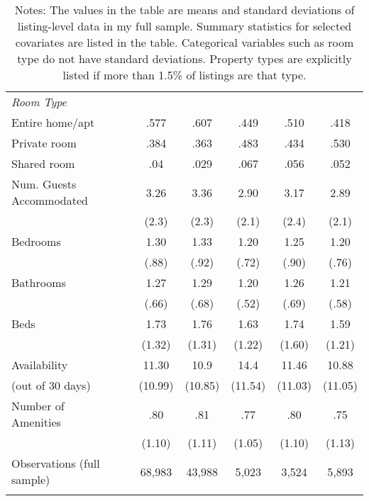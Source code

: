 {\begin{longtable}{l*{6}{c}}
\textit{Room Type} \\
Entire home/apt   &   & .577   	&      .607	&      .449  &      .510		&    .418\\
Private room       &  & 	.384		&      .363	&      .483  &      .434		&    .530\\
Shared room      &  &	.04	 	&      .029	&      .067  &      .056		&    .052\\
[1em]
Num. Guests Accommodated    &    &      3.26	&      3.36  &      2.90		&    3.17 		&	 2.89\\
               &     &     (2.3)         &     (2.3)         &     (2.1)         &     (2.4)         & (2.1)\\
[1em]
Bedrooms    &   &      1.30 &      1.33         &      1.20         &      1.25   & 1.20      \\
              &      &     (.88)         &     (.92)         &     (.72)         &     (.90)       & (.76)  \\
[1em]
Bathrooms  &   &      1.27         &       1.29         &      1.20         &      1.26 & 1.21         \\
                &    &     (.66)         &     (.68)         &     (.52)         &     (.69)         & (.58)\\
[1em]
Beds       &   &      1.73 &      1.76         &      1.63         &      1.74         & 1.59\\
               &     &     (1.32)         &     (1.31)         &     (1.22)         &     (1.60)   & (1.21)      \\
[1em]
Availability    &    &      11.30&      10.9&      14.4 &      11.46  	& 	10.88\\
(out of 30 days)         &      & (10.99)     &     (10.85)         &     (11.54)         &     (11.03)         &     (11.05)         \\
[1em]
Number of Amenities   &     &      .80		&      .81&      .77 &      .80  	& 	.75\\
           &    & (1.10)     &     (1.11)         &     (1.05)         &     (1.10)         &     (1.13)         \\


\hline
Observations (full sample)  &   & 68,983   &       43,988         &       5,023         &       3,524         &       5,893         \\
\hline\hline
\caption*{Notes: The values in the table are means and standard deviations of listing-level data in my full sample. Summary statistics for selected covariates are listed in the table. Categorical variables such as room type do not have standard deviations. Property types are explicitly listed if more than 1.5\% of listings are that type.}

\end{longtable}
}







